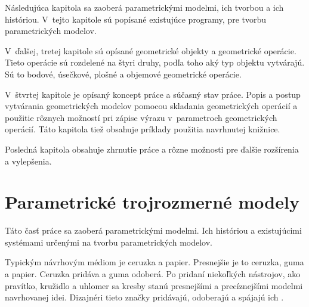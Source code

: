 Následujúca kapitola sa zaoberá parametrickými modelmi, ich tvorbou a ich históriou.
V~tejto kapitole sú popísané existujúce programy, pre tvorbu parametrických modelov.


V~ďalšej, tretej kapitole sú opísané geometrické objekty a geometrické operácie. Tieto operácie sú rozdelené na štyri druhy, podľa toho aký typ objektu vytvárajú. Sú to bodové, úsečkové, plošné a objemové geometrické operácie. 


V~štvrtej kapitole je opísaný koncept práce a súčasný stav práce. Popis a postup vytvárania geometrických modelov pomocou skladania geometrických operácií a použitie rôznych možností pri zápise výrazu v~parametroch geometrických operácií. Táto kapitola tiež obsahuje príklady použitia navrhnutej knižnice.



Posledná kapitola obsahuje zhrnutie práce a rôzne možnosti pre ďalšie rozšírenia a vylepšenia.

\chapter{Parametrické trojrozmerné modely}
Táto časť práce sa zaoberá parametrickými modelmi. Ich históriou a existujúcimi systémami určenými na tvorbu parametrických modelov.


Typickým návrhovým médiom je ceruzka a papier. Presnejšie je to ceruzka, guma a papier. Ceruzka pridáva a guma odoberá. Po pridaní niekoľkých nástrojov, ako pravítko, kružidlo a uhlomer sa kresby stanú presnejšími a precíznejšími modelmi navrhovanej idei. Dizajnéri tieto značky pridávajú, odoberajú a spájajú ich  \cite{woodbury2010elements}.

